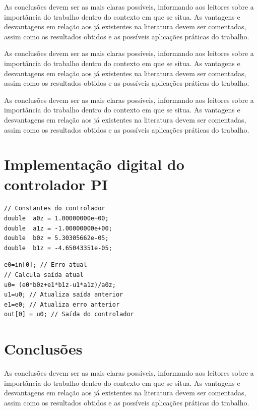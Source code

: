 As conclusões devem ser as mais claras possíveis, informando aos leitores sobre a importância do trabalho dentro do contexto em que se situa. As vantagens e desvantagens em relação aos já existentes na literatura devem ser comentadas, assim como os resultados obtidos e as possíveis aplicações práticas do trabalho.

As conclusões devem ser as mais claras possíveis, informando aos leitores sobre a importância do trabalho dentro do contexto em que se situa. As vantagens e desvantagens em relação aos já existentes na literatura devem ser comentadas, assim como os resultados obtidos e as possíveis aplicações práticas do trabalho.

As conclusões devem ser as mais claras possíveis, informando aos leitores sobre a importância do trabalho dentro do contexto em que se situa. As vantagens e desvantagens em relação aos já existentes na literatura devem ser comentadas, assim como os resultados obtidos e as possíveis aplicações práticas do trabalho.


\section{Implementação digital do controlador PI}


\begin{lstlisting}[caption={Parâmetros do controlador PI digital de tensão.},label={lst:valoresPI}]
// Constantes do controlador
double  a0z = 1.00000000e+00;
double  a1z = -1.00000000e+00;
double  b0z = 5.30305662e-05;
double  b1z = -4.65043351e-05;
\end{lstlisting}

\begin{lstlisting}[caption={Implementação do controlador PI digital de tensão.},label={lst:implementacaoPI}]
e0=in[0]; // Erro atual
// Calcula saída atual 
u0= (e0*b0z+e1*b1z-u1*a1z)/a0z; 
u1=u0; // Atualiza saída anterior
e1=e0; // Atualiza erro anterior    
out[0] = u0; // Saída do controlador
\end{lstlisting}


\section{Conclusões} 


As conclusões devem ser as mais claras possíveis, informando aos leitores sobre a importância do trabalho dentro do contexto em que se situa. As vantagens e desvantagens em relação aos já existentes na literatura devem ser comentadas, assim como os resultados obtidos e as possíveis aplicações práticas do trabalho.





\balance


